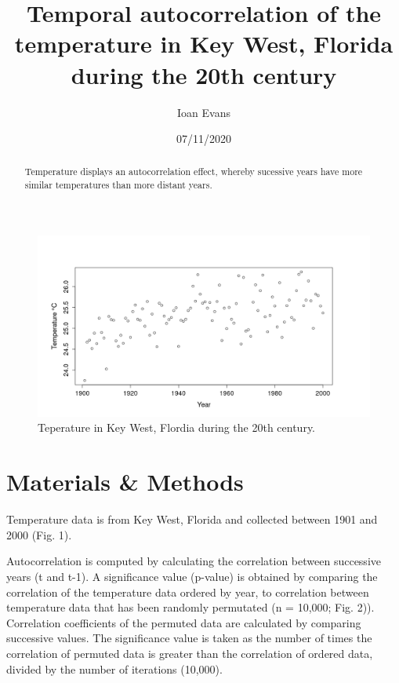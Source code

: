 \documentclass[12pt]{article}
\title{Temporal autocorrelation of the temperature in Key West, Florida during the 20th century}
\author{Ioan Evans}
\date{07/11/2020}
\begin{document}
    \maketitle

    \begin{abstract}
        Temperature displays an autocorrelation effect, whereby sucessive years have more similar temperatures than more 
        distant years. 
    \end{abstract}

    \begin{figure}[h!]
        \includegraphics[width=15cm]{Fig3}
        \centering
        \caption{Teperature in Key West, Flordia during the 20th century.}
    \end{figure}

    \section{Materials \& Methods}
        Temperature data is from Key West, Florida and collected between 1901 and 2000 (Fig. 1).
        
        Autocorrelation is computed by calculating the correlation between successive years (t and t-1).
        A significance value (p-value) is obtained by comparing the correlation of the temperature data ordered by year, to 
        correlation between temperature data that has been randomly permutated (n = 10,000; Fig. 2)). Correlation 
        coefficients of the permuted data are calculated by comparing successive values. The significance value is taken 
        as the number of times the correlation of permuted data is greater than the correlation of ordered data, divided 
        by the number of iterations (10,000).
\end{document}

